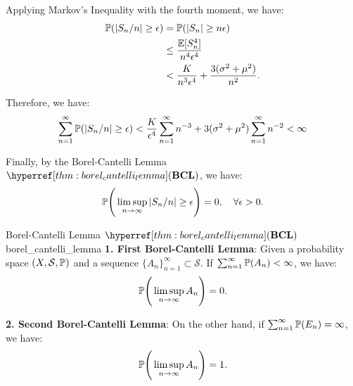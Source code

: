 \begin{proof*}
    \noindent Applying Markov's Inequality with the fourth moment, we have:
    \begin{align*}
        \mathbb{P}(|S_n/n|\ge \epsilon) &= \mathbb{P}(|S_n|\ge n\epsilon) \\ 
        &\le \frac{\mathbb{E}[S_n^4]}{n^4\epsilon^4} \\
        &< \frac{K}{n^3\epsilon^4} + \frac{3(\sigma^2 + \mu^2)}{n^2}.
    \end{align*}

    \noindent Therefore, we have:
    \begin{align}
        \sum_{n=1}^\infty \mathbb{P}(|S_n/n|\ge\epsilon) < \frac{K}{\epsilon^4}\sum_{n=1}^\infty n^{-3} + 3(\sigma^2 + \mu^2)\sum_{n=1}^\infty n^{-2} < \infty
    \end{align}

    \noindent Finally, by the Borel-Cantelli Lemma $\BCL$, we have:
    \begin{align*}
        \mathbb{P}\Bigg( \limsup_{n\to\infty} |S_n/n|\ge \epsilon \Bigg) = 0, \quad \forall \epsilon > 0.
    \end{align*}
\end{proof*}

\begin{theorem}{Borel-Cantelli Lemma $\BCL$}{borel_cantelli_lemma}
    \textbf{1. First Borel-Cantelli Lemma}: Given a probability space $(X, \mathcal{S}, \mathbb{P})$ and a sequence $\{A_n\}_{n=1}^\infty\subset\mathcal{S}$. If $\sum_{n=1}^\infty\mathbb{P}(A_n) < \infty$, we have:
    \begin{equation}
        \mathbb{P}\Bigg( \limsup_{n\to\infty} A_n \Bigg) = 0.
    \end{equation}

    \noindent\textbf{2. Second Borel-Cantelli Lemma}: On the other hand, if $\sum_{n=1}^\infty \mathbb{P}(E_n) = \infty$, we have:
    \begin{equation}
        \mathbb{P}\Bigg( \limsup_{n\to\infty} A_n \Bigg) = 1.
    \end{equation}
\end{theorem}

